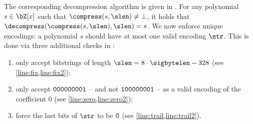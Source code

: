 \begin{algorithm}[!htp]
\caption{$\compress(s, \slen)$ \hfill}\label{alg:compress}
 \begin{algorithmic}[1]
 \State{$\str \gets \{\}$}
  
 \label{line:cbin}
 \label{line:k}
 \label{line:unary} 
 \EndFor
 \If{$(|\str| > \slen)$}\label{line:slen}
 \State{$\str \gets \bot$} \label{line:slenbot}
 \Else\label{line:else}
  \label{line:pad}
 \EndIf
 \Return{\str}
 \end{algorithmic}
\end{algorithm}

The corresponding decompression algorithm is given in \longdecompress. For any polynomial $s \in \bZ[x]$ such that $\compress(s, \slen) \neq \bot$, it holds that $\decompress ( \compress(s, \slen), \slen) = s$. We now enforce unique encodings: a polynomial $s$ should have at most one valid encoding $\str$. This is done via three additional checks in \decompress:
\begin{enumerate}
	\item only accept bitstrings of length $\slen = 8\cdot \sigbytelen - 328$ (see \cref{line:fix,line:fix2});
	\item only accept ${\tt 000000001}$ -- and not ${\tt 100000001}$ -- as a valid encoding of the coefficient $0$ (see \cref{line:zero,line:zero2});
	\item force the last bits of $\str$ to be $\tt 0$ (see \cref{line:trail,line:trail2}).
\end{enumerate}


